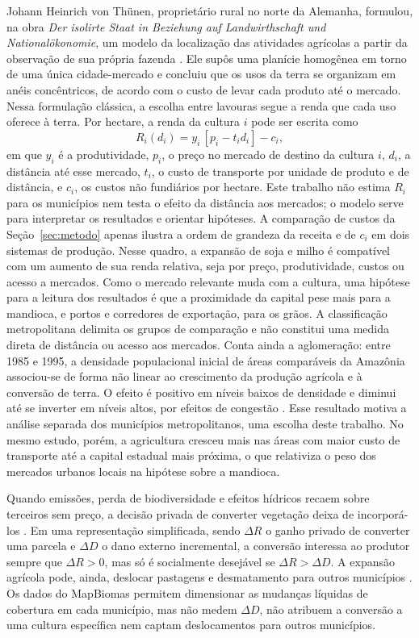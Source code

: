 \documentclass[11pt,a4paper]{article}
\begin{document}
Johann Heinrich von Thünen, proprietário rural no norte da Alemanha, formulou, na obra \textit{Der isolirte Staat in Beziehung auf Landwirthschaft und Nationalökonomie}, um modelo da localização das atividades agrícolas a partir da observação de sua própria fazenda \citep{thunen1826}. Ele supôs uma planície homogênea em torno de uma única cidade-mercado e concluiu que os usos da terra se organizam em anéis concêntricos, de acordo com o custo de levar cada produto até o mercado. Nessa formulação clássica, a escolha entre lavouras segue a renda que cada uso oferece à terra. Por hectare, a renda da cultura $i$ pode ser escrita como
\begin{equation}
R_i(d_i) = y_i\,[p_i - t_i d_i] - c_i,
\end{equation}
em que $y_i$ é a produtividade, $p_i$, o preço no mercado de destino da cultura $i$, $d_i$, a distância até esse mercado, $t_i$, o custo de transporte por unidade de produto e de distância, e $c_i$, os custos não fundiários por hectare. Este trabalho não estima $R_i$ para os municípios nem testa o efeito da distância aos mercados; o modelo serve para interpretar os resultados e orientar hipóteses. A comparação de custos da Seção~\ref{sec:metodo} apenas ilustra a ordem de grandeza da receita e de $c_i$ em dois sistemas de produção. Nesse quadro, a expansão de soja e milho é compatível com um aumento de sua renda relativa, seja por preço, produtividade, custos ou acesso a mercados. Como o mercado relevante muda com a cultura, uma hipótese para a leitura dos resultados é que a proximidade da capital pese mais para a mandioca, e portos e corredores de exportação, para os grãos. A classificação metropolitana delimita os grupos de comparação e não constitui uma medida direta de distância ou acesso aos mercados. Conta ainda a aglomeração: entre 1985 e 1995, a densidade populacional inicial de áreas comparáveis da Amazônia associou-se de forma não linear ao crescimento da produção agrícola e à conversão de terra. O efeito é positivo em níveis baixos de densidade e diminui até se inverter em níveis altos, por efeitos de congestão \citep{igliori2008}. Esse resultado motiva a análise separada dos municípios metropolitanos, uma escolha deste trabalho. No mesmo estudo, porém, a agricultura cresceu mais nas áreas com maior custo de transporte até a capital estadual mais próxima, o que relativiza o peso dos mercados urbanos locais na hipótese sobre a mandioca.

Quando emissões, perda de biodiversidade e efeitos hídricos recaem sobre terceiros sem preço, a decisão privada de converter vegetação deixa de incorporá-los \citep{baumol1988,kolstad2011}. Em uma representação simplificada, sendo $\Delta R$ o ganho privado de converter uma parcela e $\Delta D$ o dano externo incremental, a conversão interessa ao produtor sempre que $\Delta R > 0$, mas só é socialmente desejável se $\Delta R > \Delta D$. A expansão agrícola pode, ainda, deslocar pastagens e desmatamento para outros municípios \citep{arima2011,richards2014}. Os dados do MapBiomas permitem dimensionar as mudanças líquidas de cobertura em cada município, mas não medem $\Delta D$, não atribuem a conversão a uma cultura específica nem captam deslocamentos para outros municípios.
\end{document}
